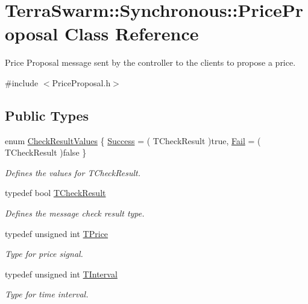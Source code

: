 \hypertarget{class_terra_swarm_1_1_synchronous_1_1_price_proposal}{\section{Terra\-Swarm\-:\-:Synchronous\-:\-:Price\-Proposal Class Reference}
\label{class_terra_swarm_1_1_synchronous_1_1_price_proposal}
}


Price Proposal message sent by the controller to the clients to propose a price.  




{\ttfamily \#include $<$Price\-Proposal.\-h$>$}

\subsection*{Public Types}
\begin{DoxyCompactItemize}
\item 
enum \hyperlink{class_terra_swarm_1_1_synchronous_1_1_price_proposal_afd8478709e56657c81455a26ce72ccf5}{Check\-Result\-Values} \{ \hyperlink{class_terra_swarm_1_1_synchronous_1_1_price_proposal_afd8478709e56657c81455a26ce72ccf5ac810ff36c431d78082d6734fe1f78025}{Success} = ( T\-Check\-Result )true, 
\hyperlink{class_terra_swarm_1_1_synchronous_1_1_price_proposal_afd8478709e56657c81455a26ce72ccf5a3ab8a257a8c21581a5377bf17c20e1cd}{Fail} = ( T\-Check\-Result )false
 \}
\begin{DoxyCompactList}\small\item\em Defines the values for T\-Check\-Result. \end{DoxyCompactList}\item 
typedef bool \hyperlink{class_terra_swarm_1_1_synchronous_1_1_price_proposal_ab5aef6a74a44439eb880f7dbff610b57}{T\-Check\-Result}
\begin{DoxyCompactList}\small\item\em Defines the message check result type. \end{DoxyCompactList}\item 
typedef unsigned int \hyperlink{class_terra_swarm_1_1_synchronous_1_1_price_proposal_a663093d390a30942a07eee3681ff8fe2}{T\-Price}
\begin{DoxyCompactList}\small\item\em Type for price signal. \end{DoxyCompactList}\item 
typedef unsigned int \hyperlink{class_terra_swarm_1_1_synchronous_1_1_price_proposal_a37e6344d030c7695bb9cb341648928ee}{T\-Interval}
\begin{DoxyCompactList}\small\item\em Type for time interval. \end{DoxyCompactList}\end{DoxyCompactItemize}
